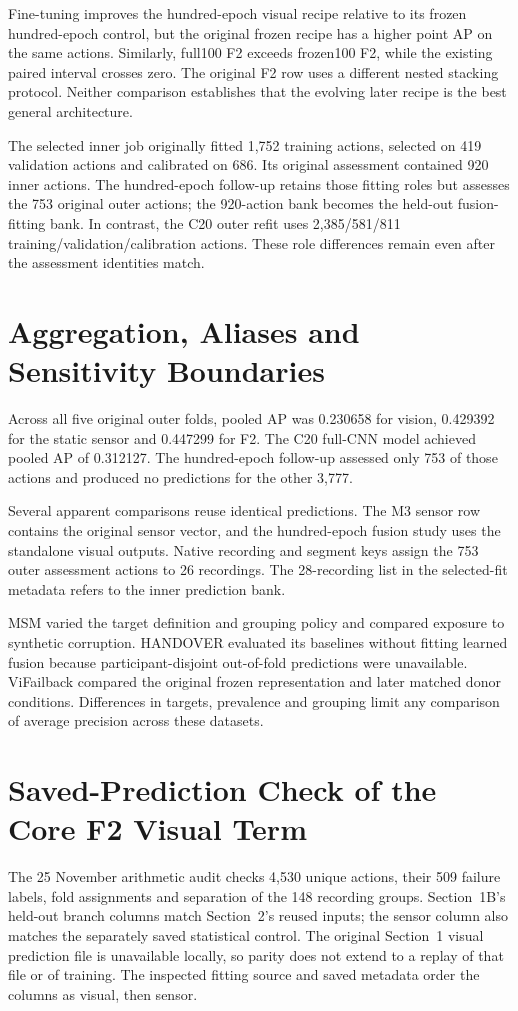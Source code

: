 Fine-tuning improves the hundred-epoch visual recipe relative to its frozen hundred-epoch control, but the original frozen recipe has a higher point AP on the same actions. Similarly, full100 F2 exceeds frozen100 F2, while the existing paired interval crosses zero. The original F2 row uses a different nested stacking protocol. Neither comparison establishes that the evolving later recipe is the best general architecture.

The selected inner job originally fitted 1,752 training actions, selected on 419 validation actions and calibrated on 686. Its original assessment contained 920 inner actions. The hundred-epoch follow-up retains those fitting roles but assesses the 753 original outer actions; the 920-action bank becomes the held-out fusion-fitting bank. In contrast, the C20 outer refit uses 2,385/581/811 training/validation/calibration actions. These role differences remain even after the assessment identities match.

\section{Aggregation, Aliases and Sensitivity Boundaries}
Across all five original outer folds, pooled AP was 0.230658 for vision, 0.429392 for the static sensor and 0.447299 for F2. The C20 full-CNN model achieved pooled AP of 0.312127. The hundred-epoch follow-up assessed only 753 of those actions and produced no predictions for the other 3,777.

Several apparent comparisons reuse identical predictions. The M3 sensor row contains the original sensor vector, and the hundred-epoch fusion study uses the standalone visual outputs. Native recording and segment keys assign the 753 outer assessment actions to 26 recordings. The 28-recording list in the selected-fit metadata refers to the inner prediction bank.

MSM varied the target definition and grouping policy and compared exposure to synthetic corruption. HANDOVER evaluated its baselines without fitting learned fusion because participant-disjoint out-of-fold predictions were unavailable. ViFailback compared the original frozen representation and later matched donor conditions. Differences in targets, prevalence and grouping limit any comparison of average precision across these datasets.

\section{Saved-Prediction Check of the Core F2 Visual Term}
The 25 November arithmetic audit checks 4,530 unique actions, their 509 failure labels, fold assignments and separation of the 148 recording groups. Section~1B's held-out branch columns match Section~2's reused inputs; the sensor column also matches the separately saved statistical control. The original Section~1 visual prediction file is unavailable locally, so parity does not extend to a replay of that file or of training. The inspected fitting source and saved metadata order the columns as visual, then sensor.

